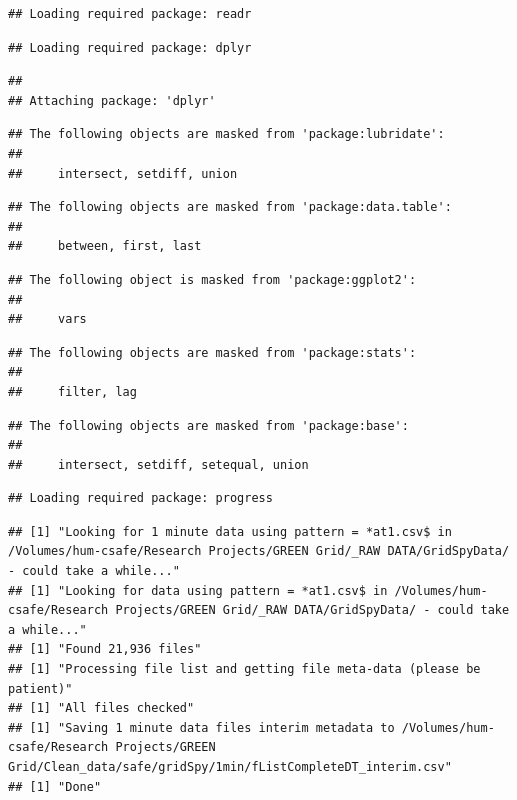 \documentclass[]{article}
\begin{document}
\begin{verbatim}
## Loading required package: readr
\end{verbatim}

\begin{verbatim}
## Loading required package: dplyr
\end{verbatim}

\begin{verbatim}
## 
## Attaching package: 'dplyr'
\end{verbatim}

\begin{verbatim}
## The following objects are masked from 'package:lubridate':
## 
##     intersect, setdiff, union
\end{verbatim}

\begin{verbatim}
## The following objects are masked from 'package:data.table':
## 
##     between, first, last
\end{verbatim}

\begin{verbatim}
## The following object is masked from 'package:ggplot2':
## 
##     vars
\end{verbatim}

\begin{verbatim}
## The following objects are masked from 'package:stats':
## 
##     filter, lag
\end{verbatim}

\begin{verbatim}
## The following objects are masked from 'package:base':
## 
##     intersect, setdiff, setequal, union
\end{verbatim}

\begin{verbatim}
## Loading required package: progress
\end{verbatim}

\begin{verbatim}
## [1] "Looking for 1 minute data using pattern = *at1.csv$ in /Volumes/hum-csafe/Research Projects/GREEN Grid/_RAW DATA/GridSpyData/ - could take a while..."
## [1] "Looking for data using pattern = *at1.csv$ in /Volumes/hum-csafe/Research Projects/GREEN Grid/_RAW DATA/GridSpyData/ - could take a while..."
## [1] "Found 21,936 files"
## [1] "Processing file list and getting file meta-data (please be patient)"
## [1] "All files checked"
## [1] "Saving 1 minute data files interim metadata to /Volumes/hum-csafe/Research Projects/GREEN Grid/Clean_data/safe/gridSpy/1min/fListCompleteDT_interim.csv"
## [1] "Done"
\end{verbatim}
\end{document}
